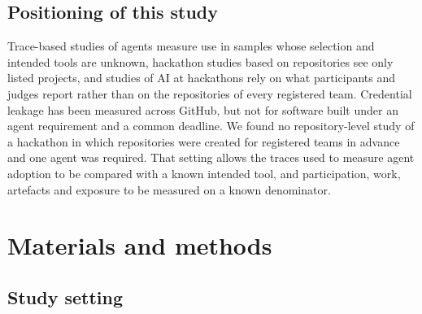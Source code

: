 \documentclass{article}
\begin{document}
\subsection{Positioning of this study}
Trace-based studies of agents measure use in samples whose selection and intended tools are unknown, hackathon studies based on repositories see only listed projects, and studies of AI at hackathons rely on what participants and judges report rather than on the repositories of every registered team. Credential leakage has been measured across GitHub, but not for software built under an agent requirement and a common deadline. We found no repository-level study of a hackathon in which repositories were created for registered teams in advance and one agent was required. That setting allows the traces used to measure agent adoption to be compared with a known intended tool, and participation, work, artefacts and exposure to be measured on a known denominator.

\section{Materials and methods}\label{sec:methods}

\subsection{Study setting}\label{sec:event}
\end{document}
